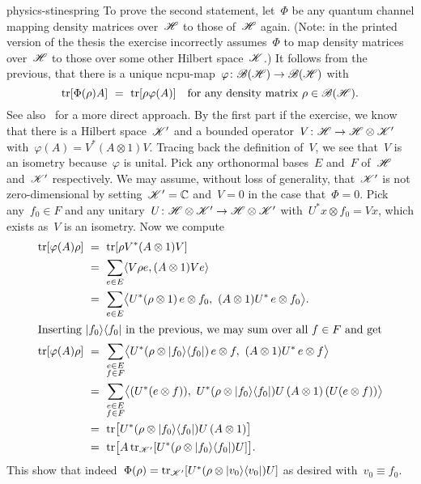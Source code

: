 \documentclass[b5page]{book}
\begin{document}
\begin{solution}{physics-stinespring}
To prove the second statement,
    let~$\Phi$ be any quantum channel
    mapping density matrices over~$\mathscr{H}$ to those of~$\mathscr{H}$ again.
(Note: in the printed version of the thesis
    the exercise incorrectly
    assumes~$\Phi$ to map density matrices over~$\mathscr{H}$
    to those over some other Hilbert space~$\mathscr{K}$.)
It follows from the previous, that there is a unique
        ncpu-map~$\varphi\colon \mathscr{B}(\mathscr{H}) \to \mathscr{B}(\mathscr{H})$ with
\begin{equation*}
    \mathop{\mathrm{tr}}[ \Phi(\rho) A] \ = \ \mathop{\mathrm{tr}}[\rho \varphi(A)]
        \quad\text{for any density matrix~$\rho\in \mathscr{B}(\mathscr{H})$}.
\end{equation*}
See also~\cite{tomamichel} for a more direct approach.
By the first part if the exercise,
    we know that there is a Hilbert space~$\mathscr{K}'$
    and a bounded operator~$V \colon \mathscr{H} \to \mathscr{H} \otimes \mathscr{K}'$
    with~$\varphi (A) = V^* (A \otimes 1) V$.
Tracing back the definition of~$V$, we see that~$V$
    is an isometry because~$\varphi$ is unital.
Pick any orthonormal bases~$E$ and~$F$ of~$\mathscr{H}$ and~$\mathscr{K}'$
    respectively.
We may assume, without loss of generality,
    that~$\mathscr{K}'$ is not zero-dimensional
    by setting~$\mathscr{K}' =\mathbb{C}$ and~$V = 0$
    in the case that~$\Phi = 0$.
Pick any~$f_0 \in F$
    and any unitary~$U\colon \mathscr{H} \otimes \mathscr{K}' \to \mathscr{H} \otimes \mathscr{K}'$
    with~$U^* x \otimes f_0 = V x$,
    which exists as~$V$ is an isometry.
Now we compute
\begin{align*}
    \TR [\varphi(A) \rho ]
    & \ = \ \TR[\rho V^* (A \otimes 1) V] \\
    & \ = \ \sum_{e \in E} \langle V \rho e, (A \otimes 1) V e \rangle \\
    & \ = \ \sum_{e \in E}
    \bigl\langle U^* (\rho \otimes 1) \,e\otimes f_0 ,
    \ (A \otimes 1) U^* \,e\otimes f_0 \bigr\rangle. \\
\intertext{Inserting~$\ketbra{f_0}{f_0}$
    in the previous,
    we may sum over all~$f \in F$ and get}
     \TR[\varphi(A) \rho] &\ = \ \sum_{\substack{e \in E \\ f\in F}}
    \bigl\langle U^* (\rho \otimes \ketbra{f_0}{f_0}) \,e\otimes f ,
    \ (A \otimes 1) U^* \,e\otimes f \bigr\rangle \\
    & \ = \ \sum_{\substack{e \in E \\ f\in F}}
    \bigl\langle
    (U^* (e\otimes f)) , \ 
    U^* (\rho \otimes \ketbra{f_0}{f_0})U \,
    (A \otimes 1) \,(U (e\otimes f)) \bigr\rangle \\
    & \ = \ 
    \TR \bigl[
    U^* (\rho \otimes \ketbra{f_0}{f_0})U \,
    (A \otimes 1)  \bigr] \\
& \ = \ 
\TR \bigl[ A   \TR\nolimits_{\scrK'}[ U^* (\rho \otimes \ketbra{f_0}{f_0} ) U] \bigr].
\end{align*}
This show that indeed~$\Phi(\rho)
    = \mathop{\mathrm{tr}}_{\mathscr{K}'}[ U^* (\rho \otimes \left|v_0\right>\!\left<v_0\right|)U]$
    as desired with~$v_0 \equiv f_0$.
\end{solution}
\end{document}

